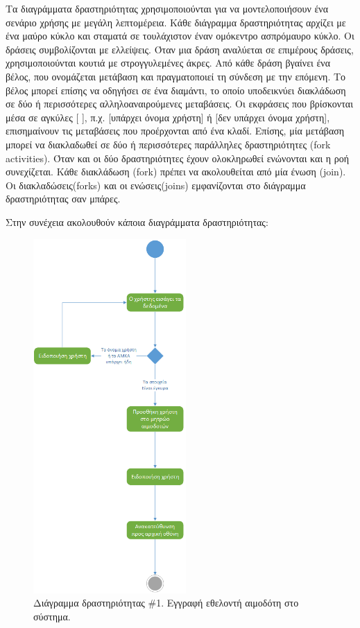 		Τα διαγράμματα δραστηριότητας χρησιμοποιούνται για να μοντελοποιήσουν ένα σενάριο χρήσης με μεγάλη λεπτομέρεια. Κάθε διάγραμμα δραστηριότητας αρχίζει με ένα μαύρο κύκλο και σταματά σε τουλάχιστον έναν ομόκεντρο ασπρόμαυρο κύκλο. Οι δράσεις συμβολίζονται με ελλείψεις. Όταν μια δράση αναλύεται σε επιμέρους δράσεις, χρησιμοποιούνται κουτιά με στρογγυλεμένες άκρες. Από κάθε δράση βγαίνει ένα βέλος, που ονομάζεται μετάβαση και πραγματοποιεί τη σύνδεση με την επόμενη. Το βέλος μπορεί επίσης να οδηγήσει σε ένα διαμάντι, το οποίο υποδεικνύει διακλάδωση σε δύο ή περισσότερες αλληλοαναιρούμενες μεταβάσεις. Οι εκφράσεις που βρίσκονται μέσα σε αγκύλες [ ], π.χ. [υπάρχει όνομα χρήστη] ή [δεν υπάρχει όνομα χρήστη], επισημαίνουν τις μεταβάσεις που προέρχονται από ένα κλαδί. Επίσης, μία μετάβαση μπορεί να διακλαδωθεί σε δύο ή περισσότερες παράλληλες δραστηριότητες (fork activities). Όταν και οι δύο δραστηριότητες έχουν ολοκληρωθεί ενώνονται και  η ροή συνεχίζεται. Κάθε διακλάδωση (fork) πρέπει να ακολουθείται από μία ένωση (join). Οι διακλαδώσεις(forks) και οι ενώσεις(joins) εμφανίζονται στο διάγραμμα δραστηριότητας σαν μπάρες.

		Στην συνέχεια ακολουθούν κάποια διαγράμματα δραστηριότητας:
		\begin{figure}[H]
		    \centering
		    \includegraphics[width=0.52\textwidth]{Register.png}
		    \caption{Διάγραμμα δραστηριότητας \#1. Εγγραφή εθελοντή αιμοδότη στο σύστημα.}
		    \label{fig:register}
		\end{figure}
		
